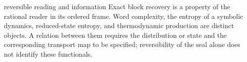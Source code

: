 \begin{apunte}{reversible reading and information}
Exact block recovery is a property of the rational reader in its ordered
frame. Word complexity, the entropy of a symbolic dynamics, reduced-state
entropy, and thermodynamic production are distinct objects. A relation
between them requires the distribution or state and the corresponding
transport map to be specified; reversibility of the seal alone does not
identify these functionals.
\end{apunte}
